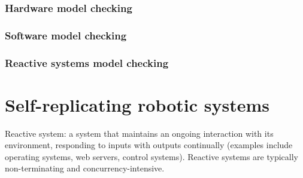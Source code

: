 \subsubsection{Hardware model checking}
\subsubsection{Software model checking}
\subsubsection{Reactive systems model checking}

\section {Self-replicating robotic systems}

Reactive system: a system that maintains an
ongoing interaction with its environment, responding to inputs with outputs continually (examples include
operating systems, web servers, control systems). Reactive systems are typically non-terminating and
concurrency-intensive. 
